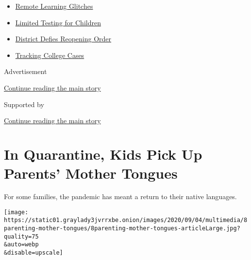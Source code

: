 \begin{itemize}
\tightlist
\item
  \href{https://www.nytimes3xbfgragh.onion/2020/09/08/us/school-districts-cyberattacks-glitches.html?name=styln-coronavirus-schools-reopening\&region=TOP_BANNER\&block=storyline_menu_recirc\&action=click\&pgtype=Article\&impression_id=03e480f1-f4bb-11ea-be14-1f129ac58728\&variant=undefined}{Remote
  Learning Glitches}
\item
  \href{https://www.nytimes3xbfgragh.onion/2020/09/08/upshot/children-testing-shortfalls-virus.html?name=styln-coronavirus-schools-reopening\&region=TOP_BANNER\&block=storyline_menu_recirc\&action=click\&pgtype=Article\&impression_id=03e480f2-f4bb-11ea-be14-1f129ac58728\&variant=undefined}{Limited
  Testing for Children}
\item
  \href{https://www.nytimes3xbfgragh.onion/2020/09/10/us/des-moines-school-opening-coronavirus.html?name=styln-coronavirus-schools-reopening\&region=TOP_BANNER\&block=storyline_menu_recirc\&action=click\&pgtype=Article\&impression_id=03e480f3-f4bb-11ea-be14-1f129ac58728\&variant=undefined}{District
  Defies Reopening Order}
\item
  \href{https://www.nytimes3xbfgragh.onion/interactive/2020/us/covid-college-cases-tracker.html?name=styln-coronavirus-schools-reopening\&region=TOP_BANNER\&block=storyline_menu_recirc\&action=click\&pgtype=Article\&impression_id=03e480f4-f4bb-11ea-be14-1f129ac58728\&variant=undefined}{Tracking
  College Cases}
\end{itemize}

Advertisement

\protect\hyperlink{after-top}{Continue reading the main story}

Supported by

\protect\hyperlink{after-sponsor}{Continue reading the main story}

\hypertarget{in-quarantine-kids-pick-up-parents-mother-tongues}{%
\section{In Quarantine, Kids Pick Up Parents' Mother
Tongues}\label{in-quarantine-kids-pick-up-parents-mother-tongues}}

For some families, the pandemic has meant a return to their native
languages.

\texttt{[image: https://static01.graylady3jvrrxbe.onion/images/2020/09/04/multimedia/8parenting-mother-tongues/8parenting-mother-tongues-articleLarge.jpg?quality=75\\\&auto=webp\\\&disable=upscale]}

